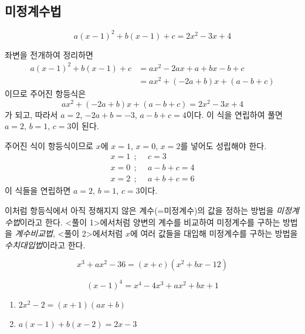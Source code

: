 \documentclass{oblivoir}
\begin{document}
\clearpage
\subsection{미정계수법}

%
\[a(x-1)^2+b(x-1)+c=2x^2-3x+4\]
\begin{mdframed}[frametitle=<풀이1>]
좌변을 전개하여 정리하면
\begin{align*}
a(x-1)^2+b(x-1)+c
&=ax^2-2ax+a+bx-b+c\\
&=ax^2+(-2a+b)x+(a-b+c)
\end{align*}
이므로 주어진 항등식은
\[ax^2+(-2a+b)x+(a-b+c)=2x^2-3x+4\]
가 되고, 따라서 \(a=2\), \(-2a+b=-3\), \(a-b+c=4\)이다.
이 식을 연립하여 풀면 \(a=2\), \(b=1\), \(c=3\)이 된다.
\end{mdframed}

\begin{mdframed}[frametitle=<풀이2>]
주어진 식이 항등식이므로 \(x\)에 \(x=1\), \(x=0\), \(x=2\)를 넣어도 성립해야 한다.
\begin{align*}
x=1	\:\:;	&\:\:c=3\\
x=0	\:\:;	&\:\:a-b+c=4\\
x=2\:\:;	&\:\:a+b+c=6
\end{align*}
이 식들을 연립하면 \(a=2\), \(b=1\), \(c=3\)이다.
\end{mdframed}

이처럼 항등식에서 아직 정해지지 않은 계수(=미정계수)의 값을 정하는 방법을 \emph{미정계수법}이라고 한다.
<풀이 1>에서처럼 양변의 계수를 비교하여 미정계수를 구하는 방법을 \emph{계수비교법},
<풀이 2>에서처럼 \(x\)에 여러 값들을 대입해 미정계수를 구하는 방법을 \emph{수치대입법}이라고 한다.

%
\[x^3+ax^2-36=(x+c)(x^2+bx-12)\]

%
\[(x-1)^4=x^4-4x^3+ax^2+bx+1\]

%
\begin{enumerate}[(1)]
\item
\(2x^2-2=(x+1)(ax+b)\)
\item
\(a(x-1)+b(x-2)=2x-3\)
\end{enumerate}

\end{document}
